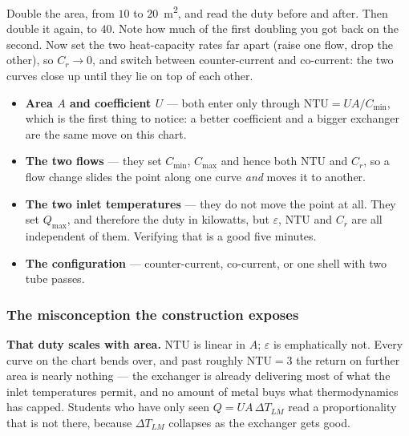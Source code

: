 \documentclass[11pt,a4paper]{article}
\begin{document}
\begin{tryit}
Double the area, from $10$ to $20$~m\textsuperscript{2}, and read the duty
before and after.  Then double it again, to $40$.  Note how much of the
first doubling you got back on the second.  Now set the two heat-capacity
rates far apart (raise one flow, drop the other), so $C_r \to 0$, and
switch between counter-current and co-current: the two curves close up
until they lie on top of each other.
\end{tryit}

\begin{itemize}[leftmargin=*,nosep]
  \item \textbf{Area $A$ and coefficient $U$} --- both enter only through
        $\mathrm{NTU} = UA/C_{\min}$, which is the first thing to notice:
        a better coefficient and a bigger exchanger are the same move on
        this chart.
  \item \textbf{The two flows} --- they set $C_{\min}$, $C_{\max}$ and
        hence both $\mathrm{NTU}$ and $C_r$, so a flow change slides the
        point along one curve \emph{and} moves it to another.
  \item \textbf{The two inlet temperatures} --- they do not move the point
        at all.  They set $Q_{\max}$, and therefore the duty in kilowatts,
        but $\varepsilon$, $\mathrm{NTU}$ and $C_r$ are all independent of
        them.  Verifying that is a good five minutes.
  \item \textbf{The configuration} --- counter-current, co-current, or one
        shell with two tube passes.
\end{itemize}

\subsubsection*{The misconception the construction exposes}

\begin{pitfall}
\textbf{That duty scales with area.}  $\mathrm{NTU}$ is linear in $A$;
$\varepsilon$ is emphatically not.  Every curve on the chart bends over,
and past roughly $\mathrm{NTU} = 3$ the return on further area is nearly
nothing --- the exchanger is already delivering most of what the inlet
temperatures permit, and no amount of metal buys what thermodynamics has
capped.  Students who have only seen $Q = UA\,\Delta T_{LM}$ read a
proportionality that is not there, because $\Delta T_{LM}$ collapses as
the exchanger gets good.
\end{pitfall}
\end{document}
